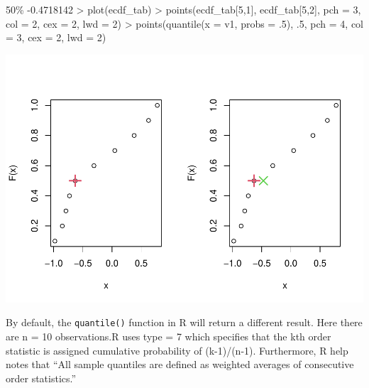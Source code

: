 \documentclass[
]{article}
\newenvironment{Shaded}{\begin{snugshade}}{\end{snugshade}}
\newcommand{\AttributeTok}[1]{\textcolor[rgb]{0.77,0.63,0.00}{#1}}
\newcommand{\DecValTok}[1]{\textcolor[rgb]{0.00,0.00,0.81}{#1}}
\newcommand{\FloatTok}[1]{\textcolor[rgb]{0.00,0.00,0.81}{#1}}
\newcommand{\FunctionTok}[1]{\textcolor[rgb]{0.00,0.00,0.00}{#1}}
\newcommand{\NormalTok}[1]{#1}
\newcommand{\SpecialCharTok}[1]{\textcolor[rgb]{0.00,0.00,0.00}{#1}}
\begin{document}
\begin{Shaded}
\begin{Highlighting}[]
       \DecValTok{50}\NormalTok{\% }
\SpecialCharTok{{-}}\FloatTok{0.4718142} 
\SpecialCharTok{\textgreater{}} \FunctionTok{plot}\NormalTok{(ecdf\_tab)}
\SpecialCharTok{\textgreater{}} \FunctionTok{points}\NormalTok{(ecdf\_tab[}\DecValTok{5}\NormalTok{,}\DecValTok{1}\NormalTok{], ecdf\_tab[}\DecValTok{5}\NormalTok{,}\DecValTok{2}\NormalTok{], }\AttributeTok{pch =} \DecValTok{3}\NormalTok{, }\AttributeTok{col =} \DecValTok{2}\NormalTok{, }\AttributeTok{cex =} \DecValTok{2}\NormalTok{, }\AttributeTok{lwd =} \DecValTok{2}\NormalTok{)}
\SpecialCharTok{\textgreater{}} \FunctionTok{points}\NormalTok{(}\FunctionTok{quantile}\NormalTok{(}\AttributeTok{x =}\NormalTok{ v1, }\AttributeTok{probs =}\NormalTok{ .}\DecValTok{5}\NormalTok{), .}\DecValTok{5}\NormalTok{, }\AttributeTok{pch =} \DecValTok{4}\NormalTok{, }\AttributeTok{col =} \DecValTok{3}\NormalTok{, }\AttributeTok{cex =} \DecValTok{2}\NormalTok{, }\AttributeTok{lwd =} \DecValTok{2}\NormalTok{)}
\end{Highlighting}
\end{Shaded}

\includegraphics[width=1\linewidth,height=1\textheight]{R_Tricks_For_ComputationStats_files/figure-latex/unnamed-chunk-5-1}

By default, the \texttt{quantile()} function in R will return a
different result. Here there are n = 10 observations.R uses type = 7
which specifies that the kth order statistic is assigned cumulative
probability of (k-1)/(n-1). Furthermore, R help notes that ``All sample
quantiles are defined as weighted averages of consecutive order
statistics.''
\end{document}
